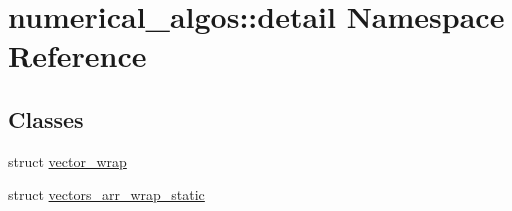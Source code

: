 \hypertarget{namespacenumerical__algos_1_1detail}{\section{numerical\-\_\-algos\-:\-:detail Namespace Reference}
\label{namespacenumerical__algos_1_1detail}
}
\subsection*{Classes}
\begin{DoxyCompactItemize}
\item 
struct \hyperlink{structnumerical__algos_1_1detail_1_1vector__wrap}{vector\-\_\-wrap}
\item 
struct \hyperlink{structnumerical__algos_1_1detail_1_1vectors__arr__wrap__static}{vectors\-\_\-arr\-\_\-wrap\-\_\-static}
\end{DoxyCompactItemize}
